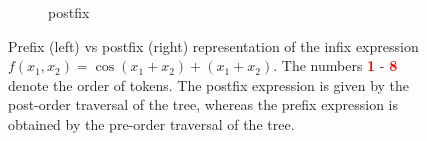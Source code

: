 \documentclass[runningheads]{llncs}
\begin{document}
\begin{figure}
\begin{subfigure}[b]{0.51\textwidth}
        \centering
        \caption{postfix} \label{subfig:postfix_tree_example}
    \end{subfigure}
    \caption{Prefix (left) vs postfix (right) representation of the infix expression $f(x_1, x_2) = \cos(x_1 + x_2) + (x_1 + x_2)$. The numbers \textcolor{red}{\textbf{1}} - \textcolor{red}{\textbf{8}} denote the order of tokens. The postfix expression is given by the post-order traversal of the tree, whereas the prefix expression is obtained by the pre-order traversal of the tree.}
    \label{fig:prefix_vs_postfix}
\end{figure}
\end{document}
